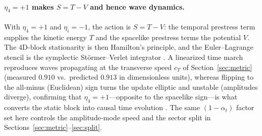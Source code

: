 \paragraph{$\eta_4=+1$ makes $S=T-V$ and hence wave dynamics.} With $\eta_4=+1$ and
$\eta_i=-1$, the action is $S=T-V$: the temporal prestress term supplies the kinetic energy
$T$ and the spacelike prestress terms the potential $V$. The 4D-block stationarity is then
Hamilton's principle, and the Euler--Lagrange stencil is the symplectic Störmer--Verlet
integrator \citep{MarsdenWest2001}. A linearized time march reproduces waves propagating at
the transverse speed $c_T$ of Section~\ref{sec:metric} (measured $0.910$ vs.\ predicted
$0.913$ in dimensionless units), whereas flipping to the all-minus (Euclidean) sign turns
the update elliptic and unstable (amplitudes diverge), confirming that $\eta_4=+1$---opposite
to the spacelike sign---is what converts the static block into causal time evolution
\citep{repo}. The same $(1-\alpha_t)$ factor set here controls the amplitude-mode speed and
the sector split in Sections~\ref{sec:metric}--\ref{sec:split}.
